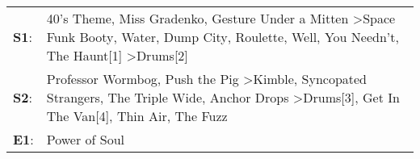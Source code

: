 \begin{supertabular}{p{0.03\textwidth}p{0.92\textwidth}}
 \textbf{S1}:  &     40's Theme\textsuperscript{}, \enspace Miss Gradenko\textsuperscript{}, \enspace Gesture Under a Mitten\textsuperscript{} \textgreater \enspace Space Funk Booty\textsuperscript{}, \enspace Water\textsuperscript{}, \enspace Dump City\textsuperscript{}, \enspace Roulette\textsuperscript{}, \enspace Well, You Needn't\textsuperscript{}, \enspace The Haunt[1]\textsuperscript{} \textgreater \enspace Drums[2]\textsuperscript{}  \enspace  \\
 \textbf{S2}:  &  Professor Wormbog\textsuperscript{}, \enspace Push the Pig\textsuperscript{} \textgreater \enspace Kimble\textsuperscript{}, \enspace Syncopated Strangers\textsuperscript{}, \enspace The Triple Wide\textsuperscript{}, \enspace Anchor Drops\textsuperscript{} \textgreater \enspace Drums[3]\textsuperscript{}, \enspace Get In The Van[4]\textsuperscript{}, \enspace Thin Air\textsuperscript{}, \enspace The Fuzz\textsuperscript{}  \enspace  \\
 \textbf{E1}:  &                                                                                                                                                                                                                                                                                                                                                                                                             Power of Soul\textsuperscript{}  \enspace  \\
\end{supertabular}
